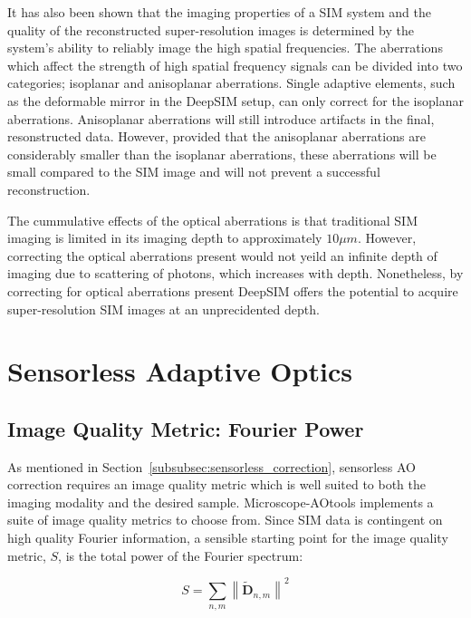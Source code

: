 It has also been shown that the imaging properties of a SIM
system and the quality of the reconstructed super-resolution
images is determined by the system's ability to reliably
image the high spatial frequencies.\cite{debarre2008adaptive,thomas2015enhanced}
The aberrations which affect the strength of high spatial 
frequency signals can be divided into two categories; 
isoplanar and anisoplanar aberrations. Single adaptive 
elements, such as the deformable mirror in the DeepSIM 
setup, can only correct for the isoplanar aberrations.
Anisoplanar aberrations will still introduce artifacts 
in the final, resonstructed data. However, provided that
the anisoplanar aberrations are considerably smaller than
the isoplanar aberrations, these aberrations will be small
compared to the SIM image and will not prevent a successful
reconstruction.\cite{thomas2015enhanced}

The cummulative effects of the optical aberrations is that
traditional SIM imaging is limited in its imaging depth to
approximately $10\mu m$.\cite{wu2018faster} However, 
correcting the optical aberrations present would not yeild
an infinite depth of imaging due to scattering of photons,
which increases with depth. Nonetheless, by correcting for
optical aberrations present DeepSIM offers the potential to 
acquire super-resolution SIM images at an unprecidented depth.

\section{Sensorless Adaptive Optics}
\label{sec:sensorless_AO}

\subsection{Image Quality Metric: Fourier Power}
\label{subsec:fourier_power_metric}

As mentioned in Section~\ref{subsubsec:sensorless_correction}, 
sensorless AO correction requires an image quality metric which
is well suited to both the imaging modality and the desired 
sample. Microscope-AOtools implements a suite of image quality
metrics to choose from. Since SIM data is contingent on high
quality Fourier information, a sensible starting point for 
the image quality metric, $S$, is the total power of the Fourier
spectrum:

\begin{equation}\label{eq:fourier_power_spectrum}
S = \sum\limits_{n,m}{\left\| \tilde{\textbf{D}}_{n,m} \right\|^2}
\end{equation}

